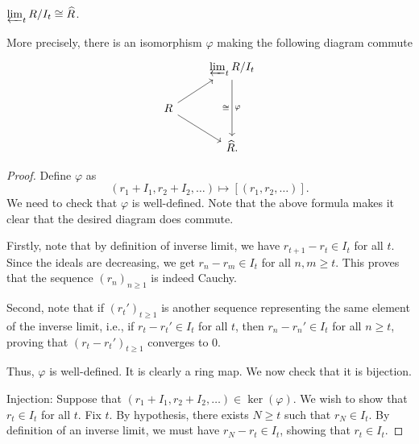 \documentclass[12pt]{article}
\begin{document}
\begin{thm} \label{thm:equivalence-of-completions}
	$\varprojlim_{t} R/I_{t} \cong \widehat{R}$.

	More precisely, there is an isomorphism $\varphi$ making the following diagram commute
	\begin{equation*} 
		\begin{tikzcd}
			& \limit_{t} R/I_{t} \arrow[dd, "\cong"', "\varphi"] \\
			R \arrow[ru] \arrow[rd] & \\
			& \widehat{R}.
		\end{tikzcd}
	\end{equation*}
\end{thm}
\begin{proof} 
	Define $\varphi$ as
	\begin{equation*} 
		(r_{1} + I_{1}, r_{2} + I_{2}, \ldots) \mapsto [(r_{1}, r_{2}, \ldots)].
	\end{equation*}
	We need to check that $\varphi$ is well-defined. Note that the above formula makes it clear that the desired diagram does commute.

	Firstly, note that by definition of inverse limit, we have $r_{t + 1} - r_{t} \in I_{t}$ for all $t$. Since the ideals are decreasing, we get $r_{n} - r_{m} \in I_{t}$ for all $n, m \ge t$. This proves that the sequence $(r_{n})_{n \ge 1}$ is indeed Cauchy.

	Second, note that if $(r_{t}')_{t \ge 1}$ is another sequence representing the same element of the inverse limit, i.e., if $r_{t} - r_{t}' \in I_{t}$ for all $t$, then $r_{n} - r_{n}' \in I_{t}$ for all $n \ge t$, proving that $(r_{t} - r_{t}')_{t \ge 1}$ converges to $0$.

	Thus, $\varphi$ is well-defined. It is clearly a ring map. We now check that it is bijection.

	Injection: Suppose that $(r_{1} + I_{1}, r_{2} + I_{2}, \ldots) \in \ker(\varphi)$. We wish to show that $r_{t} \in I_{t}$ for all $t$. \newline
	Fix $t$. By hypothesis, there exists $N \ge t$ such that $r_{N} \in I_{t}$. By definition of an inverse limit, we must have $r_{N} - r_{t} \in I_{t}$, showing that $r_{t} \in I_{t}$.


\end{proof}
\end{document}
